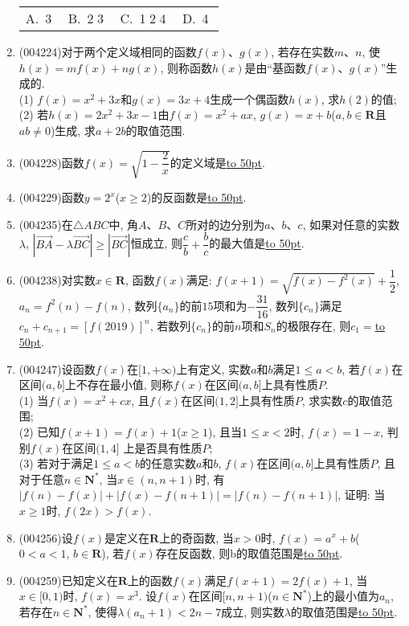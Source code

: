 \documentclass[10pt,a4paper]{article}
\newcommand{\blank}[1]{\underline{\hbox to #1pt{}}}
\newcommand{\fourch}[4]{\par\begin{tabular}{p{.23\textwidth}p{.23\textwidth}p{.23\textwidth}p{.23\textwidth}}
A.~#1 &B.~#2& C.~#3& D.~#4
\end{tabular}}
\begin{document}
\begin{enumerate}[1.]
\fourch{\textcircled{3}}{\textcircled{2}\textcircled{3}}{\textcircled{1}\textcircled{2}\textcircled{4}}{\textcircled{4}}
\item {\tiny (004224)}对于两个定义域相同的函数$f(x)$、$g(x)$, 若存在实数$m$、$n$, 使$h(x)=mf(x)+ng(x)$, 则称函数$h(x)$是由``基函数$f(x)$、$g(x)$''生成的.\\
(1) $f(x)=x^2+3x$和$g(x)=3x+4$生成一个偶函数$h(x)$, 求$h(2)$的值;\\
(2) 若$h(x)=2x^2+3x-1$由$f(x)=x^2+ax$, $g(x)=x+b$($a,b\in \mathbf{R}$且$ab\ne 0$)生成, 求$a+2b$的取值范围.
\item {\tiny (004228)}函数$f(x)=\sqrt{1-\dfrac 2x}$的定义域是\blank{50}.
\item {\tiny (004229)}函数$y=2^x$($x\ge 2$)的反函数是\blank{50}.
\item {\tiny (004235)}在$\triangle ABC$中, 角$A$、$B$、$C$所对的边分别为$a$、$b$、$c$, 如果对任意的实数$\lambda$, $|\overrightarrow{BA}-\lambda \overrightarrow{BC}|\ge |\overrightarrow{BC}|$恒成立, 则$\dfrac cb+\dfrac bc$的最大值是\blank{50}.
\item {\tiny (004238)}对实数$x\in \mathbf{R}$, 函数$f(x)$满足: $f(x+1)=\sqrt{f(x)-{f^2}(x)}+\dfrac 12$, $a_n=f^2(n)-f(n)$,
数列$\{a_n\}$的前$15$项和为$-\dfrac{31}{16}$, 数列$\{c_n\}$满足$c_n+c_{n+1}=[f(2019)]^n$, 若数列$\{c_n\}$的前$n$项和$S_n$的极限存在, 则$c_1=$\blank{50}.
\item {\tiny (004247)}设函数$f(x)$在$[1,+\infty)$上有定义, 实数$a$和$b$满足$1\le a<b$, 若$f(x)$在区间$(a,b]$上不存在最小值, 则称$f(x)$在区间$(a,b]$上具有性质$P$.\\
(1) 当$f(x)=x^2+cx$, 且$f(x)$在区间$(1,2]$上具有性质$P$, 求实数$c$的取值范围;\\
(2) 已知$f(x+1)=f(x)+1$($x\ge 1$), 且当$1\le x<2$时, $f(x)=1-x$, 判别$f(x)$在区间$(1,4]$ 上是否具有性质$P$;\\
(3) 若对于满足$1\le a<b$的任意实数$a$和$b$, $f(x)$在区间$(a,b]$上具有性质$P$, 且对于任意$n\in \mathbf{N}^*$, 当$x\in (n,n+1)$时, 有$|f(n)-f(x)|+|f(x)-f(n+1)|=|f(n)-f(n+1)|$, 证明: 当$x\ge 1$时, $f(2x)>f(x)$.
\item {\tiny (004256)}设$f(x)$是定义在$\mathbf{R}$上的奇函数, 当$x>0$时, $f(x)=a^x+b$($0<a<1$, $b\in \mathbf{R}$), 若$f(x)$存在反函数, 则b的取值范围是\blank{50}.
\item {\tiny (004259)}已知定义在$\mathbf{R}$上的函数$f(x)$满足$f(x+1)=2f(x)+1$, 当$x\in [0,1)$时, $f(x)=x^3$. 设$f(x)$在区间$[n,n+1)$($n\in \mathbf{N}^*$)上的最小值为$a_n$, 若存在$n\in \mathbf{N}^*$, 使得$\lambda (a_n+1)<2n-7$成立, 则实数$\lambda$的取值范围是\blank{50}.

\end{enumerate}
\end{document}

